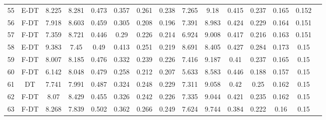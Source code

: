 \begin{longtable}{@{\hskip3pt}c@{\hskip3pt}c@{\hskip3pt}c@{\hskip3pt}c@{\hskip3pt}c@{\hskip3pt}c@{\hskip3pt}c@{\hskip3pt}c@{\hskip3pt}c@{\hskip3pt}c@{\hskip3pt}c@{\hskip3pt}c@{\hskip3pt}c@{\hskip3pt}c@{\hskip3pt}c}
         55 &           E-DT &             8.225 &          8.281 &           0.473 &           0.357 &           0.261 &           0.238 &               7.265 &            9.18 &           0.415 &         0.237 &          0.165 &           0.152 \\
         56 &           F-DT &             7.918 &          8.603 &           0.459 &           0.305 &           0.208 &           0.196 &               7.391 &           8.983 &           0.424 &         0.229 &          0.164 &           0.151 \\
         57 &           F-DT &             7.359 &          8.721 &           0.446 &            0.29 &           0.226 &           0.214 &               6.924 &           9.008 &           0.417 &         0.216 &          0.163 &           0.151 \\
         58 &           E-DT &             9.383 &           7.45 &            0.49 &           0.413 &           0.251 &           0.219 &               8.691 &           8.405 &           0.427 &         0.284 &          0.173 &            0.15 \\
         59 &           F-DT &             8.007 &          8.185 &           0.476 &           0.332 &           0.239 &           0.226 &               7.416 &           9.187 &            0.41 &         0.237 &          0.165 &            0.15 \\
         60 &           F-DT &             6.142 &          8.048 &           0.479 &           0.258 &           0.212 &           0.207 &               5.633 &           8.583 &           0.446 &         0.188 &          0.157 &            0.15 \\
         61 &             DT &             7.741 &          7.991 &           0.487 &           0.324 &           0.248 &           0.229 &               7.311 &           9.058 &            0.42 &          0.25 &          0.162 &            0.15 \\
         62 &           F-DT &              8.07 &          8.429 &           0.455 &           0.326 &           0.242 &           0.226 &               7.335 &           9.044 &           0.421 &         0.235 &          0.162 &            0.15 \\
         63 &           F-DT &             8.268 &          7.839 &           0.502 &           0.362 &           0.266 &           0.249 &               7.624 &           9.744 &           0.384 &         0.222 &           0.16 &            0.15 \\

\end{longtable}
